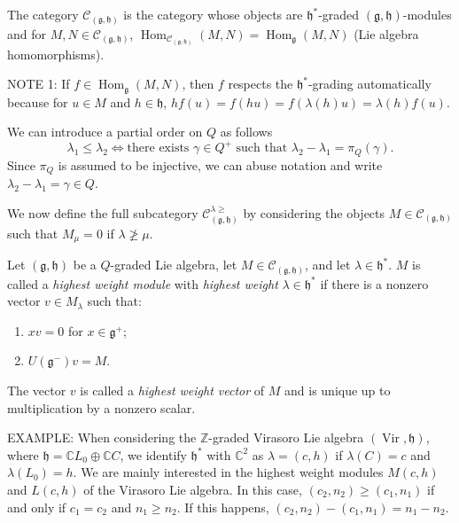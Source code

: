 \documentclass[a4paper, 12pt, reqno]{amsart}
\DeclareMathOperator{\Vir}{Vir}
\DeclareMathOperator{\Hom}{Hom}
\begin{document}
The category $\mathcal{C}_{(\mathfrak{g}, \mathfrak{h})}$ is the category whose objects are $\mathfrak{h}^*$-graded $(\mathfrak{g}, \mathfrak{h})$-modules and for $M, N \in \mathcal{C}_{(\mathfrak{g}, \mathfrak{h})}$, $\Hom_{\mathcal{C}_{(\mathfrak{g}, \mathfrak{h})}}(M, N) = \Hom_{\mathfrak{g}}(M, N)$ (Lie algebra homomorphisms).

NOTE 1: If $f \in \Hom_{\mathfrak{g}}(M, N)$, then $f$ respects the $\mathfrak{h}^*$-grading automatically because for $u \in M$ and $h \in \mathfrak{h}$, $hf(u) = f(hu) = f(\lambda(h)u) = \lambda(h)f(u)$.

We can introduce a partial order on $Q$ as follows
\begin{equation*}
  \lambda_1 \le \lambda_2 \iff \text{there exists $\gamma \in Q^+$ such that $\lambda_2 - \lambda_1 = \pi_Q(\gamma)$.}
\end{equation*}
Since $\pi_Q$ is assumed to be injective, we can abuse notation and write $\lambda_2 - \lambda_1 = \gamma \in Q$.

We now define the full subcategory $\mathcal{C}^{\lambda \ge}_{(\mathfrak{g}, \mathfrak{h})}$ by considering the objects $M \in \mathcal{C}_{(\mathfrak{g}, \mathfrak{h})}$ such that $M_{\mu} = 0$ if $\lambda \ngeq \mu$.

Let $(\mathfrak{g}, \mathfrak{h})$ be a $Q$-graded Lie algebra, let $M \in \mathcal{C}_{(\mathfrak{g}, \mathfrak{h})}$, and let $\lambda \in \mathfrak{h}^*$.
$M$ is called a \emph{highest weight module} with \emph{highest weight} $\lambda \in \mathfrak{h}^*$ if there is a nonzero vector $v \in M_{\lambda}$ such that:
\begin{enumerate}
\item $xv = 0$ for $x \in \mathfrak{g}^+$;
\item $U(\mathfrak{g}^-)v = M$.
\end{enumerate}
The vector $v$ is called a \emph{highest weight vector} of $M$ and is unique up to multiplication by a nonzero scalar.

EXAMPLE: When considering the $\mathbb{Z}$-graded Virasoro Lie algebra $(\Vir, \mathfrak{h})$, where $\mathfrak{h} = \mathbb{C}L_0 \oplus \mathbb{C}C$, we identify $\mathfrak{h}^*$ with $\mathbb{C}^2$ as $\lambda = (c, h)$ if $\lambda(C) = c$ and $\lambda(L_0) = h$.
We are mainly interested in the highest weight modules $M(c, h)$ and $L(c, h)$ of the Virasoro Lie algebra.
In this case, $(c_2, n_2) \ge (c_1, n_1)$ if and only if $c_1 = c_2$ and $n_1 \ge n_2$.
If this happens, $(c_2, n_2) - (c_1, n_1) = n_1 - n_2$.
\end{document}
